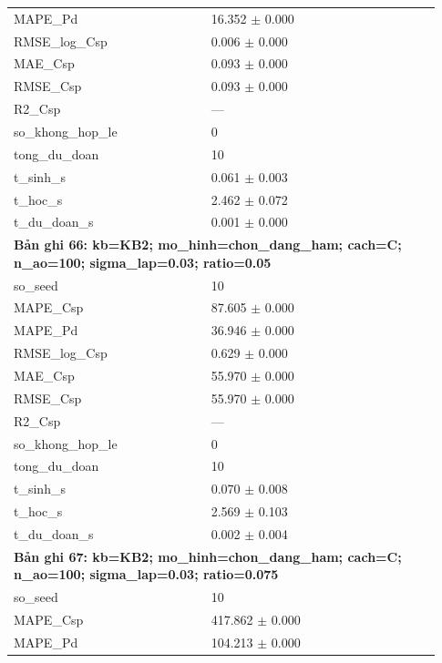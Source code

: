 \begin{longtable}{p{0.43\linewidth}p{0.50\linewidth}}
MAPE\_\allowbreak Pd & 16.352 $\pm$ 0.000 \\
RMSE\_\allowbreak log\_\allowbreak Csp & 0.006 $\pm$ 0.000 \\
MAE\_\allowbreak Csp & 0.093 $\pm$ 0.000 \\
RMSE\_\allowbreak Csp & 0.093 $\pm$ 0.000 \\
R2\_\allowbreak Csp & — \\
so\_\allowbreak khong\_\allowbreak hop\_\allowbreak le & 0 \\
tong\_\allowbreak du\_\allowbreak doan & 10 \\
t\_\allowbreak sinh\_\allowbreak s & 0.061 $\pm$ 0.003 \\
t\_\allowbreak hoc\_\allowbreak s & 2.462 $\pm$ 0.072 \\
t\_\allowbreak du\_\allowbreak doan\_\allowbreak s & 0.001 $\pm$ 0.000 \\
\midrule
\multicolumn{2}{p{0.95\linewidth}}{\textbf{Bản ghi 66: kb=KB2; mo\_hinh=chon\_dang\_ham; cach=C; n\_ao=100; sigma\_lap=0.03; ratio=0.05}} \\
so\_\allowbreak seed & 10 \\
MAPE\_\allowbreak Csp & 87.605 $\pm$ 0.000 \\
MAPE\_\allowbreak Pd & 36.946 $\pm$ 0.000 \\
RMSE\_\allowbreak log\_\allowbreak Csp & 0.629 $\pm$ 0.000 \\
MAE\_\allowbreak Csp & 55.970 $\pm$ 0.000 \\
RMSE\_\allowbreak Csp & 55.970 $\pm$ 0.000 \\
R2\_\allowbreak Csp & — \\
so\_\allowbreak khong\_\allowbreak hop\_\allowbreak le & 0 \\
tong\_\allowbreak du\_\allowbreak doan & 10 \\
t\_\allowbreak sinh\_\allowbreak s & 0.070 $\pm$ 0.008 \\
t\_\allowbreak hoc\_\allowbreak s & 2.569 $\pm$ 0.103 \\
t\_\allowbreak du\_\allowbreak doan\_\allowbreak s & 0.002 $\pm$ 0.004 \\
\midrule
\multicolumn{2}{p{0.95\linewidth}}{\textbf{Bản ghi 67: kb=KB2; mo\_hinh=chon\_dang\_ham; cach=C; n\_ao=100; sigma\_lap=0.03; ratio=0.075}} \\
so\_\allowbreak seed & 10 \\
MAPE\_\allowbreak Csp & 417.862 $\pm$ 0.000 \\
MAPE\_\allowbreak Pd & 104.213 $\pm$ 0.000 \\

\end{longtable}

